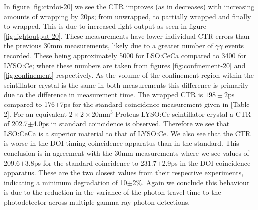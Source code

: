 In figure \ref{fig:ctrdoi-20} we see the CTR improves (as in decreases) with increasing amounts of wrapping by 20ps; from unwrapped, to partially wrapped and finally to wrapped. This is due to increased light output as seen in figure \ref{fig:lightoutput-20}. These measurements have lower individual CTR errors than the previous 30mm measurements, likely due to a greater number of $\gamma\gamma$ events recorded. These being approximately 5000 for LSO:CeCa compared to 3400 for LYSO:Ce; where these numbers are taken from figures \ref{fig:confinement-20} and \ref{fig:confinement} respectively. As the volume of the confinement region within the scintillator crystal is the same in both measurements this difference is primarily due to the difference in measurement time. The wrapped CTR is $198\pm2$ps compared to 176$\pm$7ps for the standard coincidence measurement given in [Table 2]\cite{uffray_Jarron_Meyer_Lecoq_2014}. For an equivalent $2\times2\times20$mm$^3$ Proteus LYSO:Ce scintillator crystal a CTR of 202.7$\pm$4.0ps in standard coincidence is observed. Therefore we see that LSO:CeCa is a superior material to that of LYSO:Ce. We also see that the CTR is worse in the DOI timing coincidence apparatus than in the standard. This conclusion is in agreement with the 30mm measurements where we see values of 209.6$\pm$3.8ps for the standard coincidence to 231.7$\pm$2.9ps in the DOI coincidence apparatus. These are the two closest values from their respective experiments, indicating a minimum degradation of 10$\pm$2\%. Again we conclude this behaviour is due to the reduction in the variance of the photon travel time to the photodetector across multiple gamma ray photon detections.